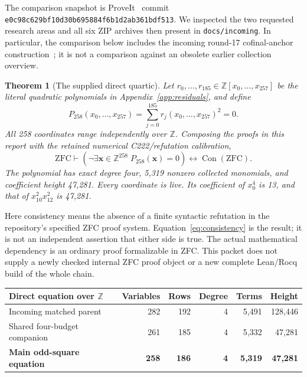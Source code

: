 \documentclass[11pt]{article}
\newtheorem{theorem}{Theorem}[section]
\newcommand{\Z}{\mathbb Z}
\newcommand{\Con}{\operatorname{Con}}
\newcommand{\ZFC}{\mathrm{ZFC}}
\newcommand{\code}[1]{\texttt{\small #1}}
\begin{document}
The comparison snapshot is ProveIt~\cite{repo} commit
\code{e0c98c629bf10d30b695884f6b1d2ab361bdf513}.
We inspected the two requested research areas and all six ZIP archives
then present in \code{docs/incoming}. In particular, the comparison below
includes the incoming round-17 cofinal-anchor construction~\cite{cofinal}; it is not a
comparison against an obsolete earlier collection overview.

\begin{theorem}[The supplied direct quartic]
Let $r_0,\ldots,r_{185}\in\Z[x_0,\ldots,x_{257}]$ be the literal
quadratic polynomials in Appendix~\ref{app:residuals}, and define
\begin{equation}
 \boxed{\quad P_{258}(x_0,\ldots,x_{257})
     =\sum_{j=0}^{185}r_j(x_0,\ldots,x_{257})^2=0.\quad}
 \label{eq:main}
\end{equation}
All 258 coordinates range independently over $\Z$. Composing the proofs
in this report with the retained numerical C222/refutation calibration,
\begin{equation}
 \ZFC\vdash
 \left(\neg\exists\mathbf x\in\Z^{258}\;
       P_{258}(\mathbf x)=0\right)
       \longleftrightarrow\Con(\ZFC).
 \label{eq:consistency}
\end{equation}
The polynomial has exact degree four, 5,319 nonzero collected monomials,
and coefficient height 47,281. Every coordinate is live. Its coefficient
of $x_0^4$ is 13, and that of $x_{10}^2x_{12}^2$ is 47,281.
\end{theorem}

Here consistency means the absence of a finite syntactic refutation in
the repository's specified ZFC proof system. Equation~\eqref{eq:consistency}
is the result; it is not an independent assertion that either side is true.
The actual mathematical dependency is an ordinary proof formalizable in
ZFC. This packet does not supply a newly checked internal ZFC proof object
or a new complete Lean/Rocq build of the whole chain.

\begin{center}\small
\begin{tabular}{lrrrrr}
\toprule
Direct equation over $\Z$ & Variables & Rows & Degree & Terms & Height\\
\midrule
Incoming matched parent & 282 & 192 & 4 & 5,491 & 128,446\\
Shared four-budget companion & 261 & 185 & 4 & 5,332 & 47,281\\
\textbf{Main odd-square equation} & \textbf{258} & \textbf{186} & \textbf{4}
 & \textbf{5,319} & \textbf{47,281}\\
\bottomrule
\end{tabular}
\end{center}
\end{document}
